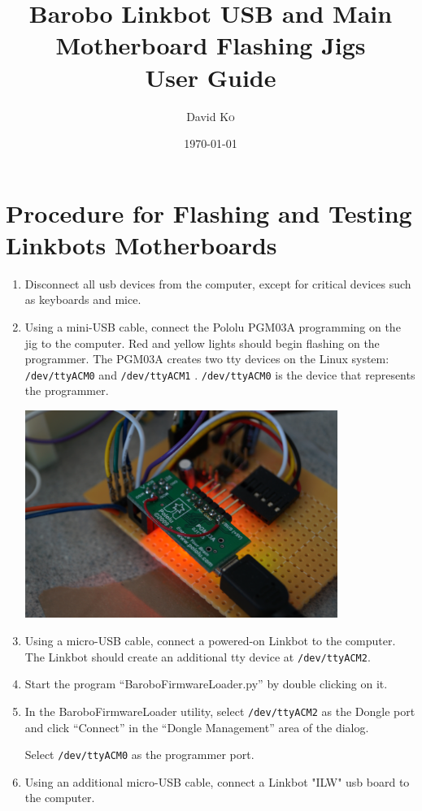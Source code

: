 \documentclass{article}
\title{Barobo Linkbot USB and Main Motherboard Flashing Jigs \\ User Guide} %
\author{David \textsc{Ko}} %
\date{\today} %
\begin{document}
\maketitle %

\section{Procedure for Flashing and Testing Linkbots Motherboards}
\begin{enumerate}
\item Disconnect all usb devices from the computer, except for critical devices
   such as keyboards and mice.
\item Using a mini-USB cable, connect the Pololu PGM03A programming on the jig to
   the computer. Red and yellow lights should begin flashing on the programmer.
   The PGM03A creates two tty devices on the Linux system: \texttt{/dev/ttyACM0} and
   \texttt{/dev/ttyACM1} . \texttt{/dev/ttyACM0} is the device that represents the programmer.

   \begin{center}
   \includegraphics[width=4in]{images/programmer.jpg}
   \end{center}

\item Using a micro-USB cable, connect a powered-on Linkbot to the computer. The
   Linkbot should create an additional tty device at \texttt{/dev/ttyACM2}.
\item Start the program ``BaroboFirmwareLoader.py'' by double clicking on it.
\item In the BaroboFirmwareLoader utility, select \texttt{/dev/ttyACM2} as the Dongle
   port and click ``Connect'' in the ``Dongle Management'' area of the dialog. 

   Select \texttt{/dev/ttyACM0} as the programmer port.
\item Using an additional micro-USB cable, connect a Linkbot "ILW" usb board to
   the computer.


\end{enumerate}
\end{document}
